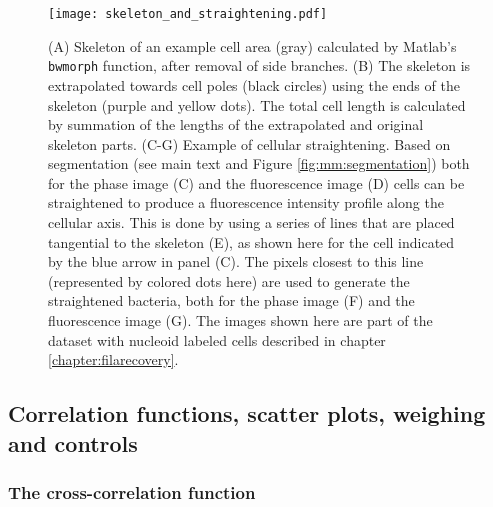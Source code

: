 \begin{figure}
	\centering
	\texttt{[image: skeleton\_and\_straightening.pdf]}
	\caption{ 
		(A) Skeleton of an example cell area (gray) calculated by Matlab's \texttt{bwmorph} function, after removal of side branches. 
		(B) The skeleton is extrapolated towards cell poles (black circles) using the ends of the skeleton (purple and yellow dots). The total cell length is calculated by summation of the lengths of the extrapolated and original skeleton parts.
		(C-G) Example of cellular straightening. Based on segmentation (see main text and Figure \ref{fig:mm:segmentation}) both for the phase image (C) and the fluorescence image (D) cells can be straightened to produce a fluorescence intensity profile along the cellular axis. This is done by using a series of lines that are placed tangential to the skeleton (E), as shown here for the cell indicated by the blue arrow in panel (C). The pixels closest to this line (represented by colored dots here) are used to generate the straightened bacteria, both for the phase image (F) and the fluorescence image (G).
		The images shown here are part of the dataset with nucleoid labeled  cells described in chapter \ref{chapter:filarecovery}.
	}
	\label{fig:mm:skeletonstraightening}
\end{figure}

\subsection{Correlation functions, scatter plots, weighing and controls}

\subsubsection{The cross-correlation function}

